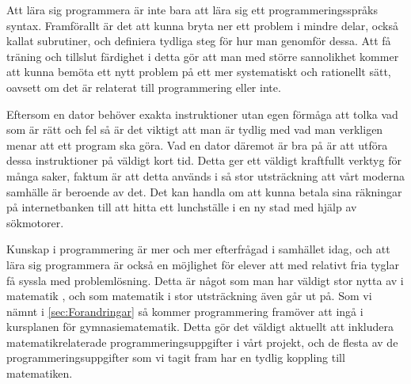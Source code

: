 \textcolor{Mahogany}{Att lära sig programmera är inte bara att lära sig ett programmeringsspråks syntax. Framförallt är det att kunna bryta ner ett problem i mindre delar, också kallat subrutiner, och definiera tydliga steg för hur man genomför dessa. Att få träning och tillslut färdighet i detta gör att man med större sannolikhet kommer att kunna bemöta ett nytt problem på ett mer systematiskt och rationellt sätt, oavsett om det är relaterat till programmering eller inte.}

\textcolor{Mahogany}{Eftersom en dator behöver exakta instruktioner utan egen förmåga att tolka vad som är rätt och fel så är det viktigt att man är tydlig med vad man verkligen menar att ett program ska göra. Vad en dator däremot är bra på är att utföra dessa instruktioner på väldigt kort tid. Detta ger ett väldigt kraftfullt verktyg för många saker, faktum är att detta används i så stor utsträckning att vårt moderna samhälle är beroende av det. Det kan handla om att kunna betala sina räkningar på internetbanken till att hitta ett lunchställe i en ny stad med hjälp av sökmotorer.}

\textcolor{Mahogany}{
    Kunskap i programmering är mer och mer efterfrågad i samhället idag, och att lära sig programmera är också en möjlighet för elever att med relativt fria tyglar få syssla med problemlösning. Detta är något som man har väldigt stor nytta av i matematik \cite{TheElephant}, och som matematik i stor utsträckning även går ut på. Som vi nämnt i \ref{sec:Forandringar} så kommer programmering framöver att ingå i kursplanen för gymnasiematematik. Detta gör det väldigt aktuellt att inkludera matematikrelaterade programmeringsuppgifter i vårt projekt, och de flesta av de programmeringsuppgifter som vi tagit fram har en tydlig koppling till matematiken.
}